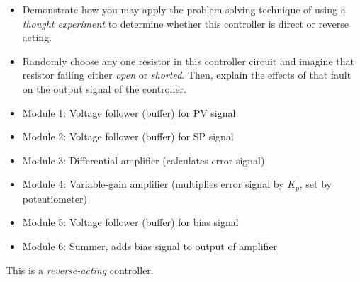 \begin{itemize}
\item{} Demonstrate how you may apply the problem-solving technique of using a {\it thought experiment} to determine whether this controller is direct or reverse acting.
\item{} Randomly choose any one resistor in this controller circuit and imagine that resistor failing either {\it open} or {\it shorted}.  Then, explain the effects of that fault on the output signal of the controller.
\end{itemize}







\begin{itemize}
\item{}Module 1: Voltage follower (buffer) for PV signal
\vskip 5pt
\item{}Module 2: Voltage follower (buffer) for SP signal
\vskip 5pt
\item{}Module 3: Differential amplifier (calculates error signal)
\vskip 5pt
\item{}Module 4: Variable-gain amplifier (multiplies error signal by $K_p$, set by potentiometer)
\vskip 5pt
\item{}Module 5: Voltage follower (buffer) for bias signal
\vskip 5pt
\item{}Module 6: Summer, adds bias signal to output of amplifier
\end{itemize} 
 
\vskip 10pt

This is a {\it reverse-acting} controller.











